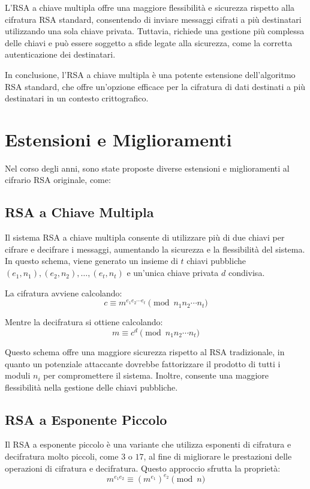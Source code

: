 \documentclass[a4paper,12pt]{report}
\begin{document}
L'RSA a chiave multipla offre una maggiore flessibilità e sicurezza rispetto alla cifratura RSA standard, consentendo di inviare messaggi cifrati a più destinatari utilizzando una sola chiave privata. Tuttavia, richiede una gestione più complessa delle chiavi e può essere soggetto a sfide legate alla sicurezza, come la corretta autenticazione dei destinatari.

In conclusione, l'RSA a chiave multipla è una potente estensione dell'algoritmo RSA standard, che offre un'opzione efficace per la cifratura di dati destinati a più destinatari in un contesto crittografico.

\section{Estensioni e Miglioramenti}
Nel corso degli anni, sono state proposte diverse estensioni e miglioramenti al cifrario RSA originale, come:

\subsection{RSA a Chiave Multipla}
Il sistema RSA a chiave multipla consente di utilizzare più di due chiavi per cifrare e decifrare i messaggi, aumentando la sicurezza e la flessibilità del sistema. In questo schema, viene generato un insieme di $t$ chiavi pubbliche $(e_1, n_1), (e_2, n_2), \ldots, (e_t, n_t)$ e un'unica chiave privata $d$ condivisa.

La cifratura avviene calcolando:
\[c \equiv m^{e_1 e_2 \cdots e_t} \pmod{n_1 n_2 \cdots n_t}\]

Mentre la decifratura si ottiene calcolando:
\[m \equiv c^d \pmod{n_1 n_2 \cdots n_t}\]

Questo schema offre una maggiore sicurezza rispetto al RSA tradizionale, in quanto un potenziale attaccante dovrebbe fattorizzare il prodotto di tutti i moduli $n_i$ per compromettere il sistema. Inoltre, consente una maggiore flessibilità nella gestione delle chiavi pubbliche.

\subsection{RSA a Esponente Piccolo}
Il RSA a esponente piccolo è una variante che utilizza esponenti di cifratura e decifratura molto piccoli, come $3$ o $17$, al fine di migliorare le prestazioni delle operazioni di cifratura e decifratura. Questo approccio sfrutta la proprietà:
\[m^{e_1 e_2} \equiv (m^{e_1})^{e_2} \pmod{n}\]
\end{document}

